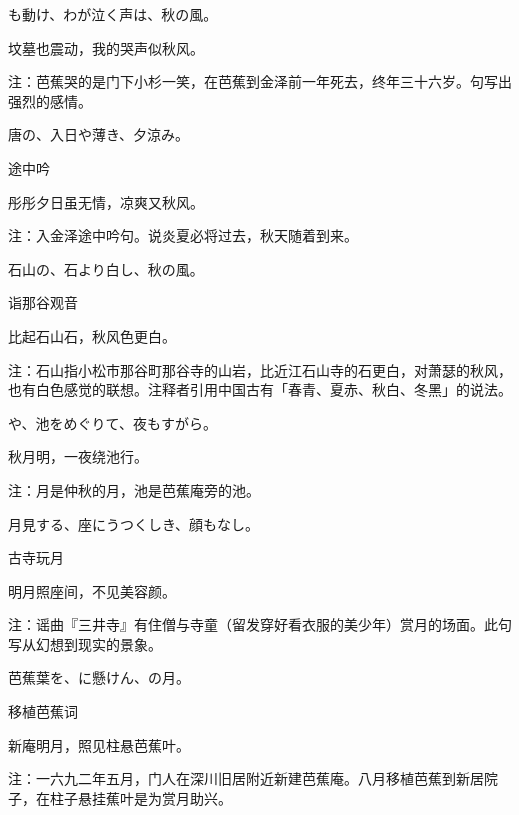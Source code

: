 \begin{haiku}
    {\FH {}も動け、わが泣く声は、秋の風。}

    {\FK 坟墓也震动，我的哭声似秋风。}

    {\FT 注：芭蕉哭的是门下小杉一笑，在芭蕉到金泽前一年死去，终年三十六岁。句写出强烈的感情。}
\end{haiku}

\begin{haiku}
    {\FH 唐の、入日や薄き、夕涼み。}

    {\FK 途中吟}

    {\FK 彤彤夕日虽无情，凉爽又秋风。}

    {\FT 注：入金泽途中吟句。说炎夏必将过去，秋天随着到来。}
\end{haiku}

\begin{haiku}
    {\FH 石山の、石より白し、秋の風。}

    {\FK 诣那谷观音}

    {\FK 比起石山石，秋风色更白。}

    {\FT 注：石山指小松市那谷町那谷寺的山岩，比近江石山寺的石更白，对萧瑟的秋风，也有白色感觉的联想。注释者引用中国古有「春青、夏赤、秋白、冬黑」的说法。}
\end{haiku}

\begin{haiku}
    {\FH {}や、池をめぐりて、夜もすがら。}

    {\FK 秋月明，一夜绕池行。}

    {\FT 注：月是仲秋的月，池是芭蕉庵旁的池。}
\end{haiku}

\begin{haiku}
    {\FH 月見する、座にうつくしき、顔もなし。}

    {\FK 古寺玩月}

    {\FK 明月照座间，不见美容颜。}

    {\FT 注：谣曲『三井寺』有住僧与寺童（留发穿好看衣服的美少年）赏月的场面。此句写从幻想到现实的景象。}
\end{haiku}

\begin{haiku}
    {\FH 芭蕉葉を、に懸けん、の月。}

    {\FK 移植芭蕉词}

    {\FK 新庵明月，照见柱悬芭蕉叶。}

    {\FT 注：一六九二年五月，门人在深川旧居附近新建芭蕉庵。八月移植芭蕉到新居院子，在柱子悬挂蕉叶是为赏月助兴。}
\end{haiku}

